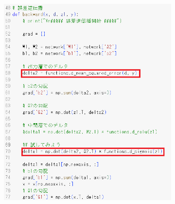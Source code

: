 \documentclass{ltjsarticle}
\begin{document}
\begin{figure}[ht]
  \centering
  \begin{subfigure}[b]{0.45\textwidth}
    \centering
    \includegraphics[width=\textwidth]{./capture/confirm_test/day1_10_1.png}
    \caption{}
    \label{fig:day1_10_1}
  \end{subfigure}
  \hfill
  \begin{subfigure}[b]{0.45\textwidth}
    \centering

\end{subfigure}
\end{figure}
\end{document}
